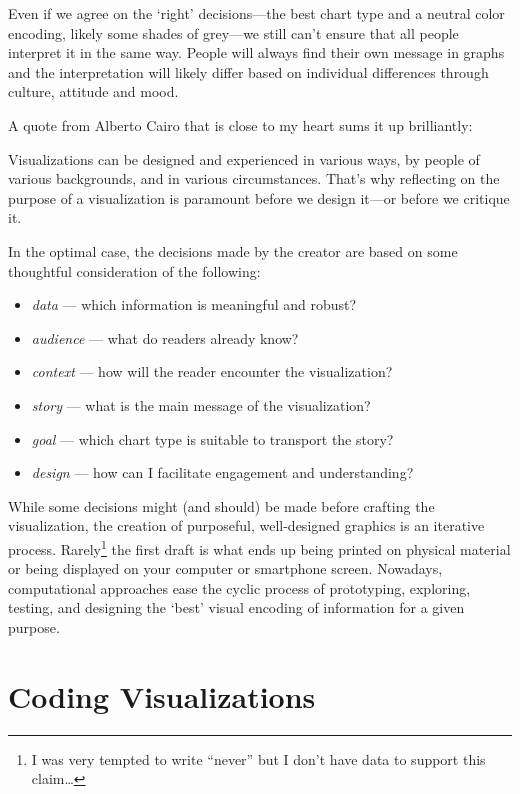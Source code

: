\documentclass[
]{krantz}
\providecommand{\tightlist}{%
  \setlength{\itemsep}{0pt}\setlength{\parskip}{0pt}}
\renewenvironment{quote}{\begin{VF}}{\end{VF}}
\begin{document}
Even if we agree on the `right' decisions---the best chart type and a neutral color encoding, likely some shades of grey---we still can't ensure that all people interpret it in the same way. People will always find their own message in graphs and the interpretation will likely differ based on individual differences through culture, attitude and mood.

A quote from Alberto Cairo that is close to my heart sums it up brilliantly:

\begin{quote}
Visualizations can be designed and experienced in various ways, by people of various backgrounds, and in various circumstances. That's why reflecting on the purpose of a visualization is paramount before we design it---or before we critique it. \citep{cairo2021}
\end{quote}

In the optimal case, the decisions made by the creator are based on some thoughtful consideration of the following:

\begin{itemize}
\tightlist
\item
  \emph{data} --- which information is meaningful and robust?
\item
  \emph{audience} --- what do readers already know?
\item
  \emph{context} --- how will the reader encounter the visualization?
\item
  \emph{story} --- what is the main message of the visualization?
\item
  \emph{goal} --- which chart type is suitable to transport the story?
\item
  \emph{design} --- how can I facilitate engagement and understanding?
\end{itemize}

While some decisions might (and should) be made before crafting the visualization, the creation of purposeful, well-designed graphics is an iterative process. Rarely\footnote{I was very tempted to write ``never'' but I don't have data to support this claim\ldots{}} the first draft is what ends up being printed on physical material or being displayed on your computer or smartphone screen. Nowadays, computational approaches ease the cyclic process of prototyping, exploring, testing, and designing the `best' visual encoding of information for a given purpose.

\hypertarget{coding}{%
\section{Coding Visualizations}\label{coding}}
\end{document}

